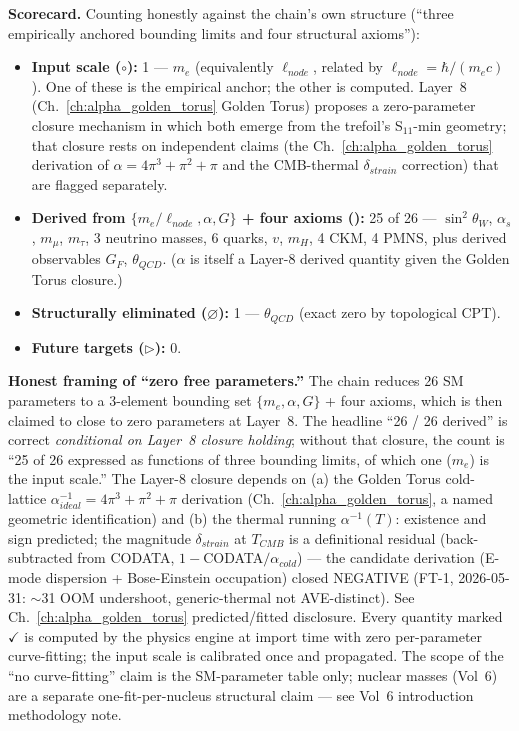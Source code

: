 \vspace{0.5em}
\noindent
\textbf{Scorecard.} Counting honestly against the chain's own structure (``three empirically anchored bounding limits and four structural axioms''):
\begin{itemize}
    \item \textbf{Input scale ($\circ$):} 1 --- $m_e$ (equivalently $\ell_{node}$, related by $\ell_{node} = \hbar/(m_e c)$). One of these is the empirical anchor; the other is computed. Layer~8 (Ch.~\ref{ch:alpha_golden_torus} Golden Torus) proposes a zero-parameter closure mechanism in which both emerge from the trefoil's S$_{11}$-min geometry; that closure rests on independent claims (the Ch.~\ref{ch:alpha_golden_torus} derivation of $\alpha = 4\pi^3+\pi^2+\pi$ and the CMB-thermal $\delta_{strain}$ correction) that are flagged separately.
    \item \textbf{Derived from $\{m_e/\ell_{node}, \alpha, G\}$ + four axioms (\checkmark):} 25 of 26 --- $\sin^2\theta_W$, $\alpha_s$, $m_\mu$, $m_\tau$, 3 neutrino masses, 6 quarks, $v$, $m_H$, 4 CKM, 4 PMNS, plus derived observables $G_F$, $\theta_{QCD}$. ($\alpha$ is itself a Layer-8 derived quantity given the Golden Torus closure.)
    \item \textbf{Structurally eliminated ($\varnothing$):} 1 --- $\theta_{QCD}$ (exact zero by topological CPT).
    \item \textbf{Future targets ($\triangleright$):} 0.
\end{itemize}
\noindent\textbf{Honest framing of ``zero free parameters.''} The chain reduces 26 SM parameters to a 3-element bounding set $\{m_e, \alpha, G\}$ + four axioms, which is then claimed to close to zero parameters at Layer~8. The headline ``26 / 26 derived'' is correct \emph{conditional on Layer~8 closure holding}; without that closure, the count is ``25 of 26 expressed as functions of three bounding limits, of which one ($m_e$) is the input scale.'' The Layer-8 closure depends on (a) the Golden Torus cold-lattice $\alpha^{-1}_{ideal} = 4\pi^3+\pi^2+\pi$ derivation (Ch.~\ref{ch:alpha_golden_torus}, a named geometric identification) and (b) the thermal running $\alpha^{-1}(T)$: existence and sign predicted; the magnitude $\delta_{strain}$ at $T_{CMB}$ is a definitional residual (back-subtracted from CODATA, $1-$CODATA$/\alpha_{cold}$) --- the candidate derivation (E-mode dispersion + Bose-Einstein occupation) closed NEGATIVE (FT-1, 2026-05-31: $\sim$31 OOM undershoot, generic-thermal not AVE-distinct). See Ch.~\ref{ch:alpha_golden_torus} predicted/fitted disclosure. Every quantity marked $\checkmark$ is computed by the physics engine at import time with zero per-parameter curve-fitting; the input scale is calibrated once and propagated. The scope of the ``no curve-fitting'' claim is the SM-parameter table only; nuclear masses (Vol~6) are a separate one-fit-per-nucleus structural claim — see Vol~6 introduction methodology note.



